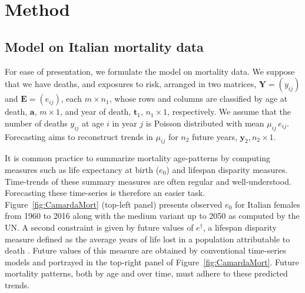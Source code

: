 \documentclass[12pt,a4paper,twoside]{article}
\begin{document}
\section{Method}

\subsection{Model on Italian mortality data}

For ease of presentation, we formulate the model on mortality data. We suppose that we have deaths, and exposures to risk, arranged in two matrices, 
$\bm{Y} = (y_{ij})$ and $\bm{E} = (e_{ij})$, each $m \times n_{1}$, whose rows and columns are classified by age at death, $\bm{a}, \,m \times 1$, and year of death, $\bm{t}_{1}, \,n_{1} \times 1$, respectively.  
We assume that the number of deaths $y_{ij}$ at age $i$ in year $j$ is Poisson distributed with mean $\mu_{ij} \,e_{ij}$. %
Forecasting aims to reconstruct trends in $\mu_{ij}$ for $n_{2}$ future years, $\bm{y}_{2}, n_{2} \times 1$.

It is common practice to summarize mortality age-patterns by computing measures such as life expectancy at birth ($e_{0}$) and lifespan disparity measures. Time-trends of these summary measures are often regular and well-understood. Forecasting these time-series is therefore an easier task. Figure~\ref{fig:CamardaMort} (top-left panel) presents observed $e_{0}$ for Italian females from 1960 to 2016 along with the medium variant up to 2050 as computed by the UN. A second constraint is given by future values of $e^{\dagger}$, a lifespan disparity measure defined as the average years of life lost in a population attributable to death \citep{VaupelCRdemo2003}. Future values of this measure are obtained by conventional time-series models and portrayed in the top-right panel of Figure~\ref{fig:CamardaMort}. Future mortality patterns, both by age and over time, must adhere to these predicted trends.
\end{document}

